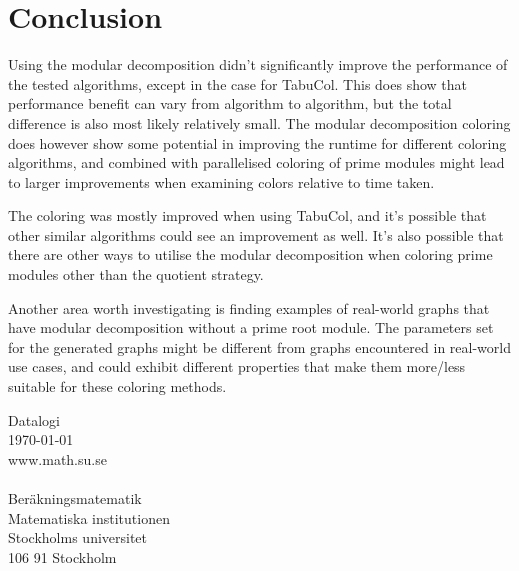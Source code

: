 \documentclass[a4paper]{article}
\newcommand{\Baksida}{\AddToShipoutPicture*{\put(0,0){\texttt{[image: kandidatbak.pdf]}}}}
\begin{document}
\section{Conclusion}

Using the modular decomposition didn't significantly improve the performance of
the tested algorithms, except in the case for TabuCol. This does show that
performance benefit can vary from algorithm to algorithm, but the total
difference is also most likely relatively small. The modular decomposition
coloring does however show some potential in improving the runtime for
different coloring algorithms, and combined with parallelised coloring of prime
modules might lead to larger improvements when examining colors relative to
time taken.

The coloring was mostly improved when using TabuCol, and it's possible that
other similar algorithms could see an improvement as well. It's also possible
that there are other ways to utilise the modular decomposition when coloring
prime modules other than the quotient strategy. 

Another area worth investigating is finding examples of real-world graphs that
have modular decomposition without a prime root module. The  parameters set for
the generated graphs might be different from graphs encountered in real-world
use cases, and could exhibit different properties that make them more/less
suitable for these coloring methods.



\printbibliography

\newpage
\Baksida %
\vspace*{13cm}
Datalogi\\
\monthyeardate\today\\
www.math.su.se\\\\
Beräkningsmatematik\\
Matematiska institutionen\\
Stockholms universitet\\
106 91 Stockholm\\
\end{document}
